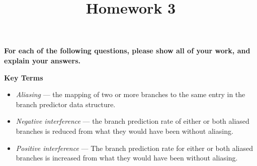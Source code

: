 \documentclass{exam}
\title{Homework 3}
\author{}
\begin{document}
\maketitle
\thispagestyle{foot}

\textbf{For each of the following questions, please show all of your work, and
explain your answers.}

\begin{mdframed}
    \textbf{Key Terms}
    \begin{itemize}
        \item \textit{Aliasing} --- the mapping of two or more branches to the
            same entry in the branch predictor data structure.
        \item \textit{Negative interference} --- the branch prediction rate of
            either or both aliased branches is reduced from what they would have
            been without aliasing.
        \item \textit{Positive interference} --- The branch prediction rate for
            either or both aliased branches is increased from what they would
            have been without aliasing.
    \end{itemize}
\end{mdframed}
\end{document}
